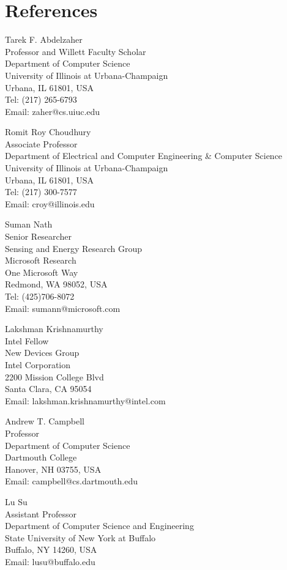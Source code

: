 \section{\sc References}
Tarek F. Abdelzaher\\
Professor and Willett Faculty Scholar\\
Department of Computer Science\\
University of Illinois at Urbana-Champaign\\
Urbana, IL 61801, USA\\
Tel: (217) 265-6793\\
Email: zaher@cs.uiuc.edu

Romit Roy Choudhury\\
Associate Professor\\
Department of Electrical and Computer Engineering \& Computer Science\\
University of Illinois at Urbana-Champaign\\
Urbana, IL 61801, USA\\
Tel: (217) 300-7577\\
Email: croy@illinois.edu

Suman Nath\\
Senior Researcher\\
Sensing and Energy Research Group\\
Microsoft Research\\
One Microsoft Way\\
Redmond, WA 98052, USA\\
Tel: (425)706-8072\\
Email: sumann@microsoft.com

Lakshman Krishnamurthy\\
Intel Fellow\\
New Devices Group\\
Intel Corporation\\
2200 Mission College Blvd\\
Santa Clara, CA 95054\\
Email: lakshman.krishnamurthy@intel.com

Andrew T. Campbell\\
Professor\\
Department of Computer Science\\
Dartmouth College\\
Hanover, NH 03755, USA\\
Email: campbell@cs.dartmouth.edu

Lu Su\\
Assistant Professor\\
Department of Computer Science and Engineering\\
State University of New York at Buffalo\\
Buffalo, NY 14260, USA\\
Email: lusu@buffalo.edu
